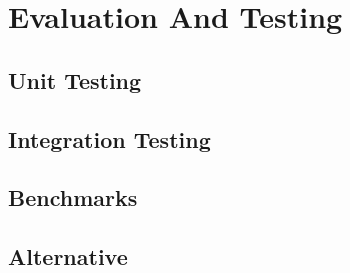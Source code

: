 \section{Evaluation And Testing} \label{evalandtesting}
\cite{komathukattil_evaluating_nodate}
\subsection{Unit Testing}
\subsection{Integration Testing}
\subsection{Benchmarks}
\subsection{Alternative}


